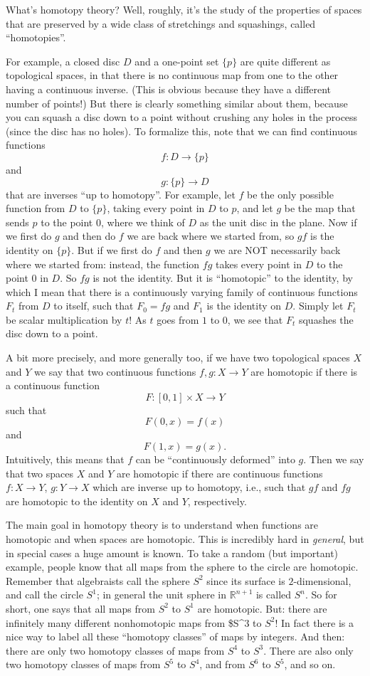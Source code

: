 \documentclass{article}
\begin{document}
What's homotopy theory? Well, roughly, it's the study of the properties
of spaces that are preserved by a wide class of stretchings and
squashings, called ``homotopies''.

For example, a closed disc \(D\) and a one-point set \(\{p\}\) are quite
different as topological spaces, in that there is no continuous map from
one to the other having a continuous inverse. (This is obvious because
they have a different number of points!) But there is clearly something
similar about them, because you can squash a disc down to a point
without crushing any holes in the process (since the disc has no holes).
To formalize this, note that we can find continuous functions
\[f\colon D\to\{p\}\] and \[g\colon\{p\}\to D\] that are inverses ``up
to homotopy''. For example, let \(f\) be the only possible function from
\(D\) to \(\{p\}\), taking every point in \(D\) to \(p\), and let \(g\)
be the map that sends \(p\) to the point \(0\), where we think of \(D\)
as the unit disc in the plane. Now if we first do \(g\) and then do
\(f\) we are back where we started from, so \(gf\) is the identity on
\(\{p\}\). But if we first do \(f\) and then \(g\) we are NOT
necessarily back where we started from: instead, the function \(fg\)
takes every point in \(D\) to the point \(0\) in \(D\). So \(fg\) is not
the identity. But it is ``homotopic'' to the identity, by which I mean
that there is a continuously varying family of continuous functions
\(F_t\) from \(D\) to itself, such that \(F_0 = fg\) and \(F_1\) is the
identity on \(D\). Simply let \(F_t\) be scalar multiplication by \(t\)!
As \(t\) goes from \(1\) to \(0\), we see that \(F_t\) squashes the disc
down to a point.

A bit more precisely, and more generally too, if we have two topological
spaces \(X\) and \(Y\) we say that two continuous functions
\(f,g\colon X \to Y\) are homotopic if there is a continuous function
\[F\colon[0,1]\times X\to Y\] such that \[F(0,x)=f(x)\] and
\[F(1,x) = g(x).\] Intuitively, this means that \(f\) can be
``continuously deformed'' into \(g\). Then we say that two spaces \(X\)
and \(Y\) are homotopic if there are continuous functions
\(f\colon X\to Y\), \(g\colon Y \to X\) which are inverse up to
homotopy, i.e., such that \(gf\) and \(fg\) are homotopic to the
identity on \(X\) and \(Y\), respectively.

The main goal in homotopy theory is to understand when functions are
homotopic and when spaces are homotopic. This is incredibly hard in
\emph{general}, but in special cases a huge amount is known. To take a
random (but important) example, people know that all maps from the
sphere to the circle are homotopic. Remember that algebraists call the
sphere \(S^2\) since its surface is \(2\)-dimensional, and call the
circle \(S^1\); in general the unit sphere in \(\mathbb{R}^{n+1}\) is
called \(S^n\). So for short, one says that all maps from \(S^2\) to
\(S^1\) are homotopic. But: there are infinitely many different
nonhomotopic maps from \$S\^{}3 to \(S^2\)! In fact there is a nice way
to label all these ``homotopy classes'' of maps by integers. And then:
there are only two homotopy classes of maps from \(S^4\) to \(S^3\).
There are also only two homotopy classes of maps from \(S^5\) to
\(S^4\), and from \(S^6\) to \(S^5\), and so on.
\end{document}
